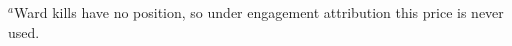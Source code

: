 \begin{table}[!t]
\begin{tabularx}{\textwidth}{@{}l r r r r r >{\raggedright\arraybackslash}X@{}}
\bottomrule
\end{tabularx}
\par\vspace{2pt}
{\raggedright\scriptsize $^{a}$Ward kills have no position, so under engagement attribution this price is never used.\par}
\end{table}

